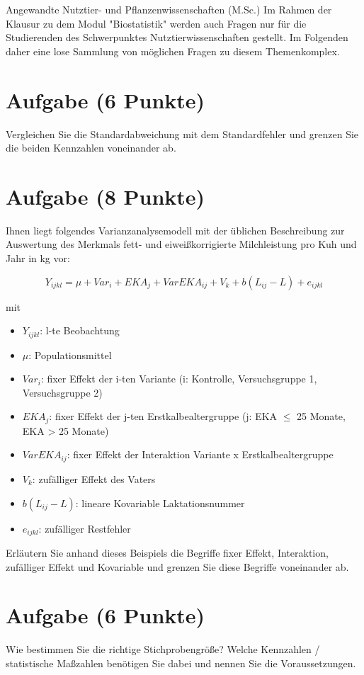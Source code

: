 \documentclass[a4paper, 9pt]{scrartcl}\usepackage[]{graphicx}\usepackage[]{xcolor}
\begin{document}
\clearpage
\begin{graybox}{Angewandte Nutztier- und Pflanzenwissenschaften (M.Sc.)}
  Im Rahmen der Klausur zu dem Modul "Biostatistik" werden auch Fragen
  nur für die Studierenden des Schwerpunktes Nutztierwissenschaften
  gestellt. Im Folgenden daher eine lose Sammlung von möglichen Fragen zu
  diesem Themenkomplex.
\end{graybox}
\clearpage

\section{Aufgabe \hfill (6 Punkte)}
Vergleichen Sie die Standardabweichung mit dem Standardfehler und grenzen
Sie die beiden Kennzahlen voneinander ab.



\section{Aufgabe \hfill (8 Punkte)}
Ihnen liegt folgendes Varianzanalysemodell mit der {\"u}blichen Beschreibung
zur Auswertung des Merkmals fett- und eiwei{\ss}korrigierte Milchleistung pro
Kuh und Jahr in kg vor:

\begin{equation*}
  Y_{ijkl} = \mu + Var_i + EKA_j + VarEKA_{ij} + V_k + b(L_{ij} - L) + e_{ijkl}
\end{equation*}

mit

\begin{itemize}
\item $Y_{ijkl}$: l-te Beobachtung
\item $\mu$: Populationsmittel 
\item $Var_i$: fixer Effekt der i-ten Variante (i: Kontrolle,
  Versuchsgruppe 1, Versuchsgruppe 2)
\item $EKA_j$: fixer Effekt der j-ten Erstkalbealtergruppe (j: EKA $\leq$ 25
  Monate, EKA > 25 Monate)
\item $VarEKA_{ij}$: fixer Effekt der Interaktion Variante x
  Erstkalbealtergruppe 
\item $V_k$: zuf{\"a}lliger Effekt des Vaters 
\item $b(L_{ij} - L)$: lineare Kovariable Laktationsnummer 
\item $e_{ijkl}$: zuf{\"a}lliger
  Restfehler
\end{itemize}
Erl{\"a}utern Sie anhand dieses Beispiels die Begriffe fixer Effekt,
Interaktion, zuf{\"a}lliger Effekt und Kovariable und grenzen Sie diese
Begriffe voneinander ab.



\section{Aufgabe \hfill (6 Punkte)}
Wie bestimmen Sie die richtige Stichprobengr{\"o}{\ss}e? Welche Kennzahlen /
statistische Ma{\ss}zahlen ben{\"o}tigen Sie dabei und nennen Sie die
Voraussetzungen.

 
\end{document}
